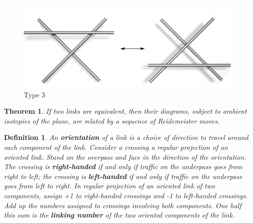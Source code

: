 \documentclass[executivepaper]{article}
\newtheorem{definition}{Definition}
\newtheorem{theorem}{Theorem}
\begin{document}
\pagebreak

\vspace*{-40mm}

\begin{figure}[H]

\centering

\includegraphics[scale=0.5]{Reidemeister_move_3.png}

\caption{Type 3}

\end{figure}

\vspace{2mm}

\begin{tcolorbox}

\begin{theorem}

\textit{If two links are equivalent, then their diagrams, subject to ambient isotopies of the plane, are related by a sequence of Reidemeister moves.}

\end{theorem}

\end{tcolorbox}

\vspace{2mm}

\begin{tcolorbox}

\begin{definition}

\textit{An \textbf{orientation} of a link is a choice of direction to travel around each component of the link. Consider a crossing a regular projection of an oriented link. Stand on the overpass and face in the direction of the orientation. The crossing is \textbf{right-handed} if and only if traffic on the underpass goes from right to left; the crossing is \textbf{left-handed} if and only if traffic on the underpass goes from left to right. In regular projection of an oriented link of two components, assign +1 to right-handed crossings and -1 to left-handed crossings. Add up the numbers assigned to crossings involving both components. One half this sum is the \textbf{linking number} of the two oriented components of the link.}

\end{definition}

\end{tcolorbox}
\end{document}
